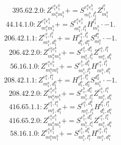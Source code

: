 \documentclass[letterpaper,10pt,fleqn,leqno,onecolumn]{article}
\begin{document}
\begin{equation} \;\;\;\;\;\;  395.62.2.0: Z^{e_{1}^{a}e_{1}^{b}}_{m_{1}^{a}m_{1}^{b}}+=S^{e_{1}^{a}e_{1}^{b}}_{m_{1}^{a},l_{1}^{b}}Z^{l_{1}^{b}}_{m_{1}^{b}} \end{equation}
\begin{equation} \;\;\;\;\;\;  44.14.1.0: Z^{e_{1}^{a}e_{1}^{b}}_{m_{1}^{a}m_{1}^{b}}+=S^{e_{1}^{a}e_{1}^{b}}_{m_{1}^{a},l_{1}^{b}}H^{l_{1}^{b}}_{m_{1}^{b}}\cdot -1. \end{equation}
\begin{equation} \;\;\;\;\;\;  206.42.1.1: Z^{e_{1}^{a},l_{1}^{b}}_{m_{1}^{a},d_{1}^{b}}+=H^{e_{1}^{a},l_{1}^{b}}_{d_{1}^{b},d_{1}^{a}}S^{d_{1}^{a}}_{m_{1}^{a}}\cdot -1. \end{equation}
\begin{equation} \;\;\;\;\;\;  206.42.2.0: Z^{e_{1}^{a}e_{1}^{b}}_{m_{1}^{a}m_{1}^{b}}+=S^{e_{1}^{b},d_{1}^{b}}_{m_{1}^{b},l_{1}^{b}}Z^{e_{1}^{a},l_{1}^{b}}_{m_{1}^{a},d_{1}^{b}} \end{equation}
\begin{equation} \;\;\;\;\;\;  56.16.1.0: Z^{e_{1}^{a}e_{1}^{b}}_{m_{1}^{a}m_{1}^{b}}+=S^{e_{1}^{b},d_{1}^{b}}_{m_{1}^{b},l_{1}^{b}}H^{e_{1}^{a},l_{1}^{b}}_{m_{1}^{a},d_{1}^{b}} \end{equation}
\begin{equation} \;\;\;\;\;\;  208.42.1.1: Z^{e_{1}^{a},l_{1}^{a}}_{m_{1}^{a},d_{1}^{a}}+=H^{e_{1}^{a},l_{1}^{a}}_{d_{1}^{a},d_{2}^{a}}S^{d_{2}^{a}}_{m_{1}^{a}}\cdot -1. \end{equation}
\begin{equation} \;\;\;\;\;\;  208.42.2.0: Z^{e_{1}^{a}e_{1}^{b}}_{m_{1}^{a}m_{1}^{b}}+=S^{e_{1}^{b},d_{1}^{a}}_{m_{1}^{b},l_{1}^{a}}Z^{e_{1}^{a},l_{1}^{a}}_{m_{1}^{a},d_{1}^{a}} \end{equation}
\begin{equation} \;\;\;\;\;\;  416.65.1.1: Z^{e_{1}^{a},l_{1}^{a}}_{m_{1}^{a},d_{1}^{a}}+=S^{e_{1}^{a},d_{1}^{b}}_{m_{1}^{a},l_{1}^{b}}H^{l_{1}^{b},l_{1}^{a}}_{d_{1}^{b},d_{1}^{a}} \end{equation}
\begin{equation} \;\;\;\;\;\;  416.65.2.0: Z^{e_{1}^{a}e_{1}^{b}}_{m_{1}^{a}m_{1}^{b}}+=S^{e_{1}^{b},d_{1}^{a}}_{m_{1}^{b},l_{1}^{a}}Z^{e_{1}^{a},l_{1}^{a}}_{m_{1}^{a},d_{1}^{a}} \end{equation}
\begin{equation} \;\;\;\;\;\;  58.16.1.0: Z^{e_{1}^{a}e_{1}^{b}}_{m_{1}^{a}m_{1}^{b}}+=S^{e_{1}^{b},d_{1}^{a}}_{m_{1}^{b},l_{1}^{a}}H^{e_{1}^{a},l_{1}^{a}}_{m_{1}^{a},d_{1}^{a}} \end{equation}
\end{document}
